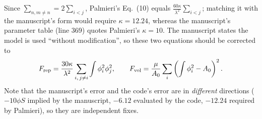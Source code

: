 \documentclass[11pt]{article}
\begin{document}
\noindent
Since $\sum_{n,m\neq n} = 2\sum_{i<j}$, Palmieri's Eq.~(10) equals
$\frac{60\kappa}{\lambda^2}\sum_{i<j}$; matching it with the manuscript's form
would require $\kappa = 12.24$, whereas the manuscript's parameter table
(line 369) quotes Palmieri's $\kappa=10$. The manuscript states the model is
used ``without modification'', so these two equations should be corrected to
\[
F_{\rm rep} = \frac{30\kappa}{\lambda^2}\sum_{i,\,j\neq i}\int\phi_i^2\phi_j^2 ,
\qquad
F_{\rm vol} = \frac{\mu}{A_0}\sum_i\left(\int\phi_i^2 - A_0\right)^2 .
\]
Note that the manuscript's error and the code's error are in \emph{different}
directions ($-10\phi S$ implied by the manuscript, $-6.12$ evaluated by the
code, $-12.24$ required by Palmieri), so they are independent fixes.
\end{document}
